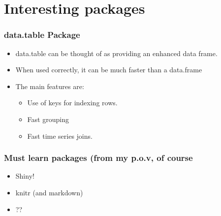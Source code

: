 \documentclass{beamer}
\begin{document}
\section{Interesting packages}
\begin{frame}
  \frametitle{data.table Package}
  \begin{itemize}
    \item data.table can be thought of as providing an enhanced data frame.
    \item When used correctly, it can be much faster than a data.frame
    \item The main features are:
      \begin{itemize}
        \item Use of keys for indexing rows. 
        \item Fast grouping
        \item Fast time series joins.
      \end{itemize}
  \end{itemize}
\end{frame}

\begin{frame}
  \frametitle{Must learn packages (from my p.o.v, of course}
  \begin{itemize}
    \item Shiny!
    \item knitr (and markdown)
    \item ??
  \end{itemize}
\end{frame}
\end{document}
